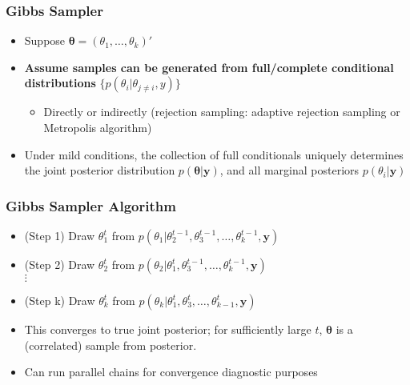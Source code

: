 \subsubsection{Gibbs Sampler}
        \begin{itemize} %
        \item Suppose $\pmb{\theta} = (\theta_{1}, \dots, \theta_{k})'$ 
        \item {\bf Assume samples can be generated from full/complete conditional distributions} $\{p(\theta_{i}|\theta_{j \neq i},y)\}$ 
              \begin{itemize}
              \item Directly or indirectly (rejection sampling: adaptive rejection sampling or Metropolis algorithm)
              \end{itemize}
        \item Under mild conditions, the collection of full conditionals uniquely determines the joint posterior distribution $p(\pmb{\theta}|\pmb{y})$, and all marginal posteriors $p(\theta_{i}|\pmb{y})$
        \end{itemize} %

\subsubsection{Gibbs Sampler Algorithm}
        \begin{itemize} %
        \item (Step 1) Draw $\theta_{1}^{t}$ from $p \left( \theta_{1}|\theta_{2}^{t-1}, \theta_{3}^{t-1},\dots,\theta_{k}^{t-1},\pmb{y} \right)$ 
        
        \item (Step 2) Draw $\theta_{2}^{t}$ from $p \left(\theta_{2}|\theta_{1}^{t}, \theta_{3}^{t-1},\dots,\theta_{k}^{t-1},\pmb{y} \right)$ \\
        $\vdots$ 
        \item (Step k) Draw $\theta_{k}^{t}$ from $p \left( \theta_{k}|\theta_{1}^{t}, \theta_{3}^{t},\dots,\theta_{k-1}^{t},\pmb{y} \right)$ \\
        \item This converges to true joint posterior; for sufficiently large $t$, $\pmb{\theta}$ is a (correlated) sample from posterior.
        \item Can run parallel chains for convergence diagnostic purposes
        \end{itemize} %

